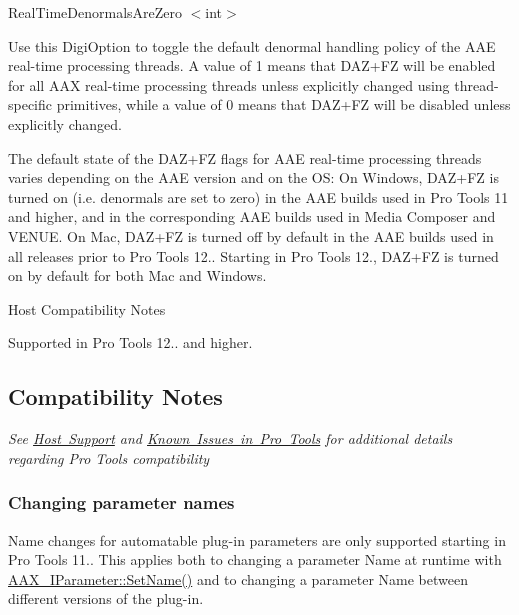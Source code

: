 \begin{DoxyItemize}
\item  {\ttfamily Real\+Time\+Denormals\+Are\+Zero $<$int$>$}

Use this Digi\+Option to toggle the default denormal handling policy of the A\+AE real-\/time processing threads. A value of 1 means that D\+A\+Z+\+FZ will be enabled for all A\+AX real-\/time processing threads unless explicitly changed using thread-\/specific primitives, while a value of 0 means that D\+A\+Z+\+FZ will be disabled unless explicitly changed.

The default state of the D\+A\+Z+\+FZ flags for A\+AE real-\/time processing threads varies depending on the A\+AE version and on the OS\+: On Windows, D\+A\+Z+\+FZ is turned on (i.\+e. denormals are set to zero) in the A\+AE builds used in Pro Tools 11 and higher, and in the corresponding A\+AE builds used in Media Composer and V\+E\+N\+UE. On Mac, D\+A\+Z+\+FZ is turned off by default in the A\+AE builds used in all releases prior to Pro Tools 12.. Starting in Pro Tools 12., D\+A\+Z+\+FZ is turned on by default for both Mac and Windows.

\begin{DoxyRefDesc}{Host Compatibility Notes}
\item[\mbox{\hyperlink{a00786__compatibility_notes000020}{Host Compatibility Notes}}]Supported in Pro Tools 12.. and higher.\end{DoxyRefDesc}





\end{DoxyItemize}



 \hypertarget{a00830_aax_pro_tools_guide_07_compatibility_notes}{}\subsection{Compatibility Notes}\label{a00830_aax_pro_tools_guide_07_compatibility_notes}
{\itshape See \mbox{\hyperlink{a00845}{Host Support}} and \mbox{\hyperlink{a00846_knownissues_ptsw}{Known Issues in Pro Tools}} for additional details regarding Pro Tools compatibility }

\hypertarget{a00830_subsection__changing_parameter_names}{}\subsubsection{Changing parameter names}\label{a00830_subsection__changing_parameter_names}
Name changes for automatable plug-\/in parameters are only supported starting in Pro Tools 11.. This applies both to changing a parameter Name at runtime with \mbox{\hyperlink{a01857_a480e9947cdaee6f26ca2bbaeb9de56b2}{A\+A\+X\+\_\+\+I\+Parameter\+::\+Set\+Name()}} and to changing a parameter Name between different versions of the plug-\/in.

